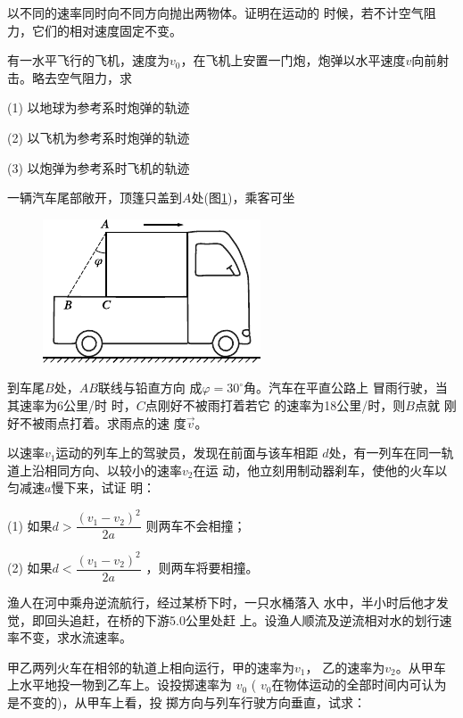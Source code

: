 \begin{exercises}

\exercise 以不同的速率同时向不同方向抛出两物体。证明在运动的
时候，若不计空气阻力，它们的相对速度固定不变。

\exercise 有一水平飞行的飞机，速度为$ v _ { 0 }$，在飞机上安置一门炮，炮弹以水平速度$ v $向前射击。略去空气阻力，求

(1) 以地球为参考系时炮弹的轨迹

(2) 以飞机为参考系时炮弹的轨迹

(3) 以炮弹为参考系时飞机的轨迹

\exercise 一辆汽车尾部敞开，顶篷只盖到$A$处(图\ref{fig:02.17})，乘客可坐
\begin{figure}
  \includegraphics{figure/fig02.17}
  \caption{}
  \label{fig:02.17}
\end{figure}
到车尾$B$处，$AB$联线与铅直方向
成$ \varphi = 3 0 ^ { \circ }  $角。汽车在平直公路上
冒雨行驶，当其速率为6公里/时
时，$C$点刚好不被雨打着若它
的速率为18公里/时，则$B$点就
刚好不被雨点打着。求雨点的速
度$ \vec{v} $。

\exercise 以速率$ v _ { 1 }  $运动的列车上的驾驶员，发现在前面与该车相距
$d$处，有一列车在同一轨道上沿相同方向、以较小的速率$v_2$在运
动，他立刻用制动器刹车，使他的火车以匀减速$a$慢下来，试证
明：

(1) 如果$d > \dfrac { \left( v _ { 1 } - v _ { 2 } \right) ^ { 2 } } { 2 a }$
则两车不会相撞；

(2) 如果$d < \dfrac { \left( v _ { 1 } - v _ { 2 } \right) ^ { 2 } } { 2 a }$
，则两车将要相撞。

\clearpage
\exercise 渔人在河中乘舟逆流航行，经过某桥下时，一只水桶落入
水中，半小时后他才发觉，即回头追赶，在桥的下游5.0公里处赶
上。设渔人顺流及逆流相对水的划行速率不变，求水流速率。

\exercise 甲乙两列火车在相邻的轨道上相向运行，甲的速率为$v_1$，
乙的速率为$v_2$。从甲车上水平地投一物到乙车上。设投掷速率为
$v _ { 0 }$ ( $v_0  $在物体运动的全部时间内可认为是不变的)，从甲车上看，投
掷方向与列车行驶方向垂直，试求：


\end{exercises}
